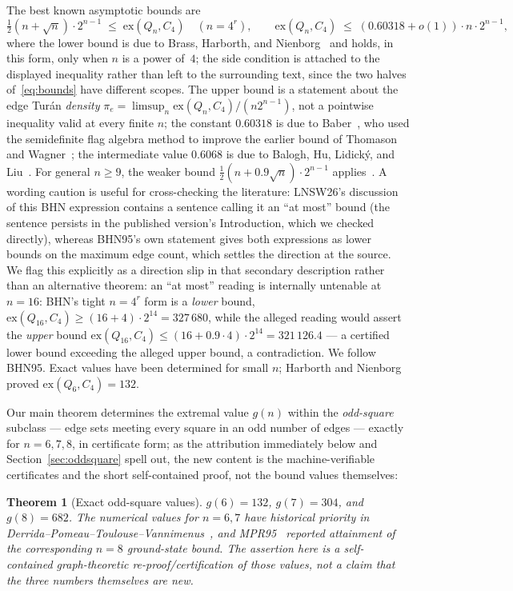 \documentclass[12pt,a4paper]{article}
\newtheorem{theorem}{Theorem}
\theoremstyle{definition}
\newcommand{\ex}{\mathrm{ex}}
\begin{document}
The best known asymptotic bounds are
\begin{equation}\label{eq:bounds}
\tfrac{1}{2}(n+\sqrt{n})\cdot2^{n-1}\;\le\;\ex(Q_n,C_4)
\quad (n=4^r),
\qquad
\ex(Q_n,C_4)\;\le\;(0.60318+o(1))\cdot n\cdot2^{n-1},
\end{equation}
where the lower bound is due to Brass, Harborth, and
Nienborg~\cite{BHN95} and holds, in this form, only when $n$ is a power
of~$4$; the side condition is attached to the displayed inequality rather
than left to the surrounding text, since the two halves of~\eqref{eq:bounds}
have different scopes. The upper bound is a statement about the edge
Tur\'an \emph{density} $\pi_e=\limsup_n\ex(Q_n,C_4)/(n2^{n-1})$, not a
pointwise inequality valid at every finite $n$; the constant $0.60318$
is due to Baber~\cite{Bab12}, who used the semidefinite flag algebra
method to improve the earlier bound of Thomason and Wagner~\cite{TW09};
the intermediate value $0.6068$ is due to Balogh, Hu, Lidick\'y, and
Liu~\cite{BHLL12}.
For general $n\ge9$, the weaker bound
$\tfrac{1}{2}(n+0.9\sqrt{n})\cdot2^{n-1}$ applies~\cite{BHN95}.
A wording caution is useful for cross-checking the literature: LNSW26's
discussion of this BHN expression contains a sentence calling it an ``at
most'' bound (the sentence persists in the published version's
Introduction, which we checked directly), whereas BHN95's own statement
gives both expressions as lower bounds on the maximum edge count, which
settles the direction at the source. We flag this explicitly as a
direction slip in that secondary description rather than an alternative
theorem: an ``at most'' reading is internally untenable at $n=16$: BHN's tight
$n=4^r$ form is a \emph{lower} bound,
$\ex(Q_{16},C_4)\ge(16+4)\cdot2^{14}=327\,680$, while the alleged
reading would assert the \emph{upper} bound
$\ex(Q_{16},C_4)\le(16+0.9\cdot4)\cdot2^{14}=321\,126.4$ --- a
certified lower bound exceeding the alleged upper bound, a
contradiction. We follow BHN95.
Exact values have been determined for small $n$; Harborth and Nienborg~\cite{HN94}
proved $\ex(Q_6,C_4)=132$.

Our main theorem determines the extremal value $g(n)$ within the
\emph{odd-square} subclass --- edge sets meeting every square in an odd
number of edges --- exactly for $n=6,7,8$, in certificate form; as the
attribution immediately below and Section~\ref{sec:oddsquare} spell out,
the new content is the machine-verifiable certificates and the short
self-contained proof, not the bound values themselves:

\begin{theorem}[Exact odd-square values]\label{thm:oddsquare}
$g(6)=132$, $g(7)=304$, and $g(8)=682$. The numerical values for $n=6,7$
have historical priority in Derrida--Pomeau--Toulouse--Vannimenus~\cite{DPTV79},
and MPR95~\cite{MPR95} reported attainment of the corresponding $n=8$
ground-state bound. The assertion here is a self-contained graph-theoretic
re-proof/certification of those values, not a claim that the three numbers
themselves are new.
\end{theorem}
\end{document}
